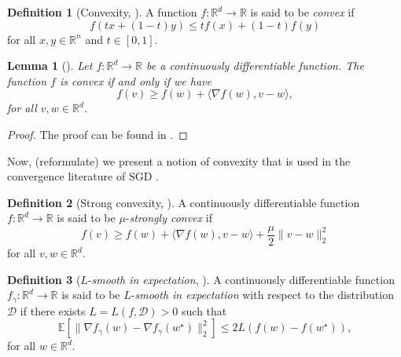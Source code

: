 \documentclass[12pt]{article}
\newtheorem{lemma}[lemma]{Lemma}
\theoremstyle{definition}
\newtheorem{definition}[definition]{Definition}
\numberwithin{equation}{section}
\newcommand{\R}{\mathbb{R}}
\newcommand{\norm}[1]{\lVert{#1}\rVert_2}
\begin{document}
\begin{definition}[Convexity, ]
  A function $f : \mathbb{R}^d \rightarrow \mathbb{R}$ is said to be \emph{convex} if 
  \begin{equation}
    f(tx+(1-t)y) \leq tf(x)+(1-t)f(y)
  \end{equation}
  for all $x,y \in \mathbb{R}^n$ and $t \in [0,1]$.
\end{definition}
\begin{lemma}[]
  \label{lemma:convexity}
  Let $f : \mathbb{R}^d \rightarrow \mathbb{R}$ be a continuously differentiable function. The function $f$ is convex if and only if we have
  \begin{equation*}
    f(v) \geq f(w) + \langle \nabla f(w), v-w \rangle,
  \end{equation*}
  for all $v,w \in \R^d$.
\end{lemma}
\begin{proof}
  The proof can be found in \autocite{boydConvexOptimization2004}.
\end{proof}

Now, (reformulate) we present a notion of convexity that is used in the convergence literature of SGD \autocite{sebbouhAlmostSureConvergence2021}. 
\begin{definition}[Strong convexity, ]
  A continuously differentiable function $f : \mathbb{R}^d \rightarrow \mathbb{R}$ is said to be $\mu$-\emph{strongly convex} if
  \begin{equation}
    f(v) \geq f(w) + \langle \nabla f(w), v - w \rangle + \frac{\mu}{2} \norm{v - w}^2
  \end{equation}
  for all $v, w \in \mathbb{R}^d$.
\end{definition}

\begin{definition}[$L$-\emph{smooth in expectation}, ]
  A continuously differentiable  function $f_{\gamma}:\mathbb{R}^d \rightarrow \mathbb{R}$ is said to be $L$-\emph{smooth in expectation} with respect to the distribution $\mathcal{D}$ if there exists $L = L(f, \mathcal{D}) > 0$ such that 
  \begin{equation}
    \mathbb{E}[\norm{\nabla f_{\gamma}(w) - \nabla f_{\gamma}(w^\star)}^2] \leq 2 L(f(w) - f(w^\star)),
  \end{equation}
  for all $w \in \mathbb{R}^d$. 
\end{definition}
\end{document}
